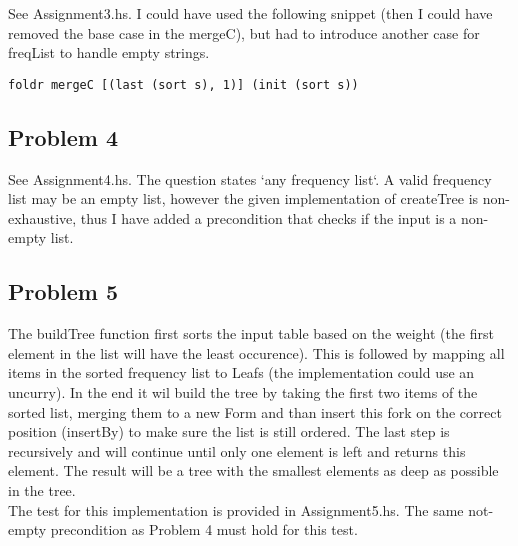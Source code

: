 See Assignment3.hs. I could have used the following snippet (then I could have removed the base case in the mergeC), but had to introduce another case for freqList to handle empty strings.

\begin{lstlisting}
foldr mergeC [(last (sort s), 1)] (init (sort s))
\end{lstlisting}


\subsection*{Problem 4}

See Assignment4.hs. The question states `any frequency list`. A valid frequency list may be an empty list, however the given implementation of createTree is non-exhaustive,
thus I have added a precondition that checks if the input is a non-empty list.

\subsection*{Problem 5}

The buildTree function first sorts the input table based on the weight (the first element in the list will have the least occurence).
This is followed by mapping all items in the sorted frequency list to Leafs (the implementation could use an uncurry).
In the end it wil build the tree by taking the first two items of the sorted list, merging them to a new Form and than insert this fork on the correct position (insertBy) to make sure the list is still ordered.
The last step is recursively and will continue until only one element is left and returns this element.
The result will be a tree with the smallest elements as deep as possible in the tree. \\
The test for this implementation is provided in Assignment5.hs. The same not-empty precondition as Problem 4 must hold for this test.